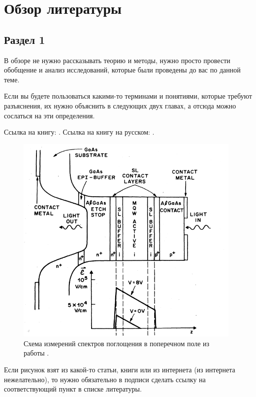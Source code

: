 \documentclass[14pt,oneside]{extarticle}
\begin{document}
\pagebreak
\section{Обзор литературы}

\subsection{Раздел 1}

В обзоре не нужно рассказывать теорию и методы, нужно просто провести обобщение и анализ исследований, которые были проведены до вас по данной теме.

Если вы будете пользоваться какими-то терминами и понятиями, которые требуют разъяснения, их нужно объяснить в следующих двух главах, а отсюда можно сослаться на эти определения.

Ссылка на книгу: \cite{datta1}.
Ссылка на книгу на русском: \cite{fedotkin1}.

\begin{figure}
\begin{center}
    \includegraphics[width=11cm]{images/Miller2-Figure2.png}
    \caption{\label{fig:miller2-2}
        Схема измерений спектров поглощения в поперечном поле из работы \cite{miller1}.}
\end{center}
\end{figure}
    
Если рисунок взят из какой-то статьи, книги или из интернета (из интернета нежелательно), то нужно обязательно в подписи сделать ссылку на соответствующий пункт в списке литературы.
\end{document}
